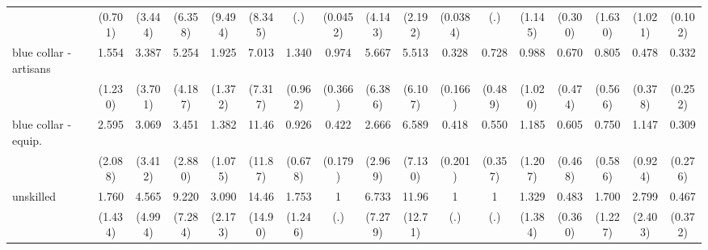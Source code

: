 {\begin{tabular}{l*{16}{c}}
                    &     (0.701)         &     (3.444)         &     (6.358)         &     (9.494)         &     (8.345)         &         (.)         &    (0.0452)         &     (4.143)         &     (2.192)         &    (0.0384)         &         (.)         &     (1.145)         &     (0.300)         &     (1.630)         &     (1.021)         &     (0.102)         \\
[1em]
blue collar - artisans&       1.554         &       3.387         &       5.254\sym{*}  &       1.925         &       7.013         &       1.340         &       0.974         &       5.667         &       5.513         &       0.328\sym{*}  &       0.728         &       0.988         &       0.670         &       0.805         &       0.478         &       0.332         \\
                    &     (1.230)         &     (3.701)         &     (4.187)         &     (1.372)         &     (7.317)         &     (0.962)         &     (0.366)         &     (6.386)         &     (6.107)         &     (0.166)         &     (0.489)         &     (1.020)         &     (0.474)         &     (0.566)         &     (0.378)         &     (0.252)         \\
[1em]
blue collar - equip.&       2.595         &       3.069         &       3.451         &       1.382         &       11.46\sym{*}  &       0.926         &       0.422\sym{*}  &       2.666         &       6.589         &       0.418         &       0.550         &       1.185         &       0.605         &       0.750         &       1.147         &       0.309         \\
                    &     (2.088)         &     (3.412)         &     (2.880)         &     (1.075)         &     (11.87)         &     (0.678)         &     (0.179)         &     (2.969)         &     (7.130)         &     (0.201)         &     (0.357)         &     (1.207)         &     (0.468)         &     (0.586)         &     (0.924)         &     (0.276)         \\
[1em]
unskilled           &       1.760         &       4.565         &       9.220\sym{**} &       3.090         &       14.46\sym{**} &       1.753         &           1         &       6.733         &       11.96\sym{*}  &           1         &           1         &       1.329         &       0.483         &       1.700         &       2.799         &       0.467         \\
                    &     (1.434)         &     (4.994)         &     (7.284)         &     (2.173)         &     (14.90)         &     (1.246)         &         (.)         &     (7.279)         &     (12.71)         &         (.)         &         (.)         &     (1.384)         &     (0.360)         &     (1.227)         &     (2.403)         &     (0.372)         \\

\end{tabular}}
